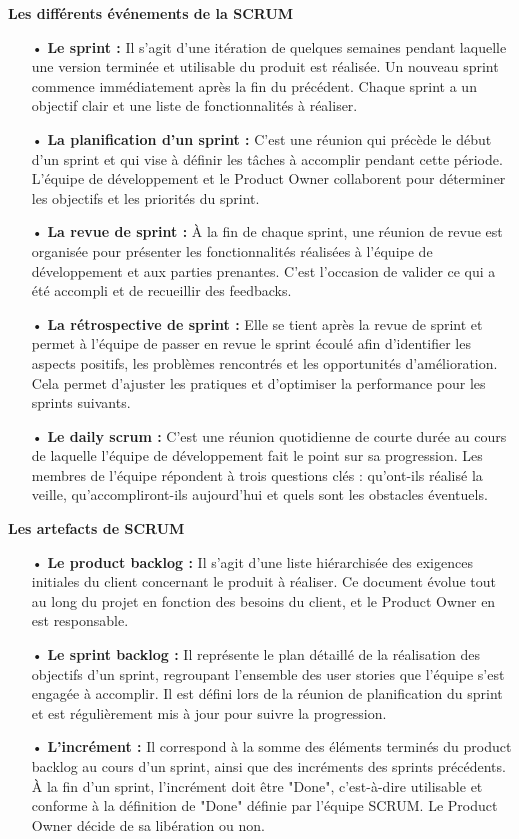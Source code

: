 \textbf{\large{Les différents événements de la SCRUM}}
\medskip
\begin{itemize}
    \item[•] \textbf{Le sprint :} Il s'agit d'une itération de quelques semaines pendant laquelle une version terminée et utilisable du produit est réalisée. Un nouveau sprint commence immédiatement après la fin du précédent. Chaque sprint a un objectif clair et une liste de fonctionnalités à réaliser.
    \item[•] \textbf{La planification d'un sprint :} C'est une réunion qui précède le début d'un sprint et qui vise à définir les tâches à accomplir pendant cette période. L'équipe de développement et le Product Owner collaborent pour déterminer les objectifs et les priorités du sprint.
    \item[•] \textbf{La revue de sprint :} À la fin de chaque sprint, une réunion de revue est organisée pour présenter les fonctionnalités réalisées à l'équipe de développement et aux parties prenantes. C'est l'occasion de valider ce qui a été accompli et de recueillir des feedbacks.
    \item[•] \textbf{La rétrospective de sprint :} Elle se tient après la revue de sprint et permet à l'équipe de passer en revue le sprint écoulé afin d'identifier les aspects positifs, les problèmes rencontrés et les opportunités d'amélioration. Cela permet d'ajuster les pratiques et d'optimiser la performance pour les sprints suivants.
    \item[•] \textbf{Le daily scrum :} C'est une réunion quotidienne de courte durée au cours de laquelle l'équipe de développement fait le point sur sa progression. Les membres de l'équipe répondent à trois questions clés : qu'ont-ils réalisé la veille, qu'accompliront-ils aujourd'hui et quels sont les obstacles éventuels.\\
\end{itemize}

\textbf{\large{Les artefacts de SCRUM}}
\medskip
\begin{itemize}
    \item[•] \textbf{Le product backlog :} Il s'agit d'une liste hiérarchisée des exigences initiales du client concernant le produit à réaliser. Ce document évolue tout au long du projet en fonction des besoins du client, et le Product Owner en est responsable.
    \item[•] \textbf{Le sprint backlog :} Il représente le plan détaillé de la réalisation des objectifs d'un sprint, regroupant l'ensemble des user stories que l'équipe s'est engagée à accomplir. Il est défini lors de la réunion de planification du sprint et est régulièrement mis à jour pour suivre la progression.
    \item[•] \textbf{L'incrément :} Il correspond à la somme des éléments terminés du product backlog au cours d'un sprint, ainsi que des incréments des sprints précédents. À la fin d'un sprint, l'incrément doit être "Done", c'est-à-dire utilisable et conforme à la définition de "Done" définie par l'équipe SCRUM. Le Product Owner décide de sa libération ou non.
\end{itemize}


